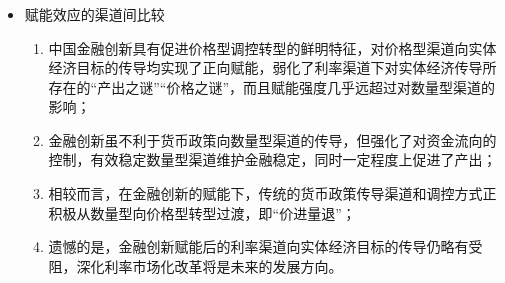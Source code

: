 \documentclass[12pt,aspectratio=169]{ctexbeamer}
\begin{document}
			\begin{frame}
				\frametitle{}
				\begin{itemize}
					\item 赋能效应的渠道间比较
					\begin{enumerate}
						\justifying
						\item 中国金融创新具有促进价格型调控转型的鲜明特征，对价格型渠道向实体经济目标的传导均实现了正向赋能，弱化了利率渠道下对实体经济传导所存在的“产出之谜”“价格之谜”，而且赋能强度几乎远超过对数量型渠道的影响；
						\item 金融创新虽不利于货币政策向数量型渠道的传导，但强化了对资金流向的控制，有效稳定数量型渠道维护金融稳定，同时一定程度上促进了产出；
						\item 相较而言，在金融创新的赋能下，传统的货币政策传导渠道和调控方式正积极从数量型向价格型转型过渡，即“价进量退”；
						\item 遗憾的是，金融创新赋能后的利率渠道向实体经济目标的传导仍略有受阻，深化利率市场化改革将是未来的发展方向。
					\end{enumerate}
				\end{itemize}
			\end{frame}
			
\end{document}
